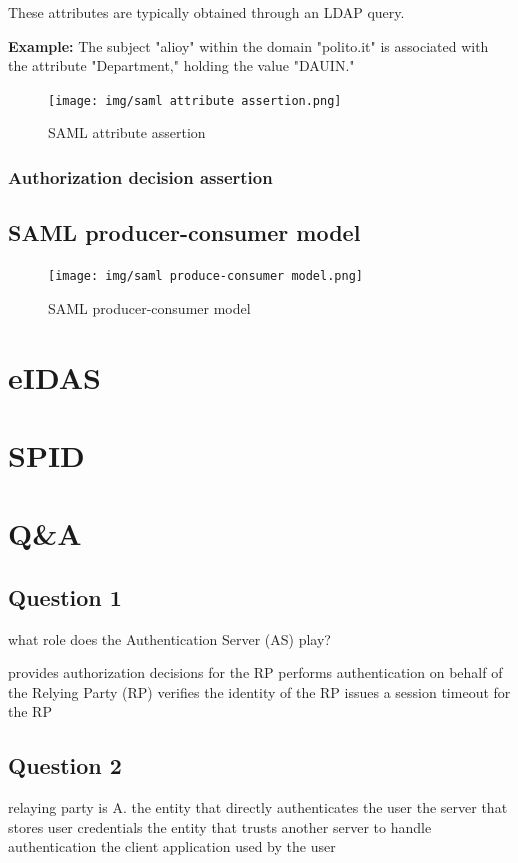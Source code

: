 \noindent These attributes are typically obtained through an LDAP
query.

\noindent \textbf{Example:} The subject "alioy" within the domain
"polito.it" is associated with the attribute "Department," holding the
value "DAUIN."

\begin{figure}[H]
  \centering
  \texttt{[image: img/saml attribute
  assertion.png]}
  \caption{SAML attribute assertion}
\end{figure}

\subsubsection{Authorization decision assertion}

\subsection{SAML producer-consumer model}

\begin{figure}[H]
  \centering
  \texttt{[image: img/saml produce-consumer
  model.png]}
  \caption{SAML producer-consumer model}
\end{figure}



\section{eIDAS}

\section{SPID}

\section{Q\&A}
\subsection*{Question 1}
what role does the Authentication Server (AS) play?
\begin{itemize}
  \incorrect provides authorization decisions for the RP
  \correct performs authentication on behalf of the Relying Party (RP)
  \incorrect verifies the identity of the RP
  \incorrect issues a session timeout for the RP
\end{itemize}

\subsection*{Question 2}
\begin{itemize}
  \incorrect relaying party is A. the entity that directly authenticates the user 
  \incorrect  the server that stores user credentials
  \correct  the entity that trusts another server to handle authentication
  \incorrect  the client application used by the user
\end{itemize}

